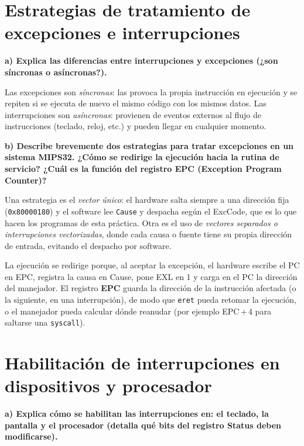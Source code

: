 \documentclass[11pt,a4paper]{article}
\begin{document}
\section{Estrategias de tratamiento de excepciones e interrupciones}

\noindent\textbf{a) Explica las diferencias entre interrupciones y excepciones (¿son síncronas o asíncronas?).}

\medskip
\noindent Las excepciones son \emph{síncronas}: las provoca la propia instrucción en ejecución y se repiten si se ejecuta de nuevo el mismo código con los mismos datos. Las interrupciones son \emph{asíncronas}: provienen de eventos externos al flujo de instrucciones (teclado, reloj, etc.) y pueden llegar en cualquier momento.

\medskip
\noindent\textbf{b) Describe brevemente dos estrategias para tratar excepciones en un sistema MIPS32. ¿Cómo se redirige la ejecución hacia la rutina de servicio? ¿Cuál es la función del registro EPC (Exception Program Counter)?}

\medskip
\noindent Una estrategia es el \emph{vector único}: el hardware salta siempre a una dirección fija (\texttt{0x80000180}) y el software lee \texttt{Cause} y despacha según el ExcCode, que es lo que hacen los programas de esta práctica. Otra es el uso de \emph{vectores separados o interrupciones vectorizadas}, donde cada causa o fuente tiene su propia dirección de entrada, evitando el despacho por software.

La ejecución se redirige porque, al aceptar la excepción, el hardware escribe el PC en EPC, registra la causa en Cause, pone EXL en 1 y carga en el PC la dirección del manejador. El registro \textbf{EPC} guarda la dirección de la instrucción afectada (o la siguiente, en una interrupción), de modo que \texttt{eret} pueda retomar la ejecución, o el manejador pueda calcular dónde reanudar (por ejemplo EPC\,+\,4 para saltarse una \texttt{syscall}).

\section{Habilitación de interrupciones en dispositivos y procesador}

\noindent\textbf{a) Explica cómo se habilitan las interrupciones en: el teclado, la pantalla y el procesador (detalla qué bits del registro Status deben modificarse).}
\end{document}
